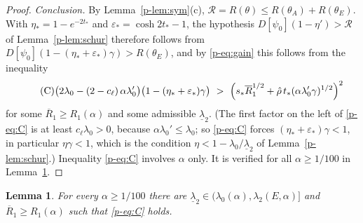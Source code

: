 \documentclass[11pt]{article}
\newtheorem{lemma}[theorem]{Lemma}
\theoremstyle{remark}
\newcommand{\cR}{\mathcal{R}}
\begin{document}
\begin{proof}
\emph{Conclusion.} By Lemma~\ref{p-lem:sym}(c), $\cR=R(\theta)\le R(\theta_A)+R(\theta_E)$. With
$\eta_*=1-e^{-2t_*}$ and $\varepsilon_*=\cosh2t_*-1$, the hypothesis
$D[\psi_0](1-\eta')>\cR$ of Lemma~\ref{p-lem:schur} therefore follows from
$D[\psi_0](1-(\eta_*+\varepsilon_*)\gamma)>R(\theta_E)$, and by \eqref{p-eq:gain} this follows
from the inequality
\begin{equation}\label{p-eq:C}\tag{C}
  \bigl(2\lambda_0-(2-c_\ell)\,\alpha\lambda_0'\bigr)\bigl(1-(\eta_*+\varepsilon_*)\gamma\bigr)
  \ >\ \Bigl(s_*\overline R_1^{1/2}+\hat\rho\,t_*(\alpha\lambda_0'\gamma)^{1/2}\Bigr)^2
\end{equation}
for some $\overline R_1\ge R_1(\alpha)$ and some admissible $\underline\lambda_2$. (The first
factor on the left of \eqref{p-eq:C} is at least $c_\ell\lambda_0>0$, because
$\alpha\lambda_0'\le\lambda_0$; so \eqref{p-eq:C} forces $(\eta_*+\varepsilon_*)\gamma<1$, in
particular $\eta\gamma<1$, which is the condition $\eta<1-\lambda_0/\underline\lambda_2$ of
Lemma~\ref{p-lem:schur}.) Inequality \eqref{p-eq:C}
involves $\alpha$ only. It is verified for all $\alpha\ge1/100$ in Lemma~\ref{p-lem:Ccheck}.
\end{proof}

\begin{lemma}\label{p-lem:Ccheck}
For every $\alpha\ge1/100$ there are $\underline\lambda_2\in(\lambda_0(\alpha),\lambda_2(E,\alpha)]$
and $\overline R_1\ge R_1(\alpha)$ such that \eqref{p-eq:C} holds.
\end{lemma}
\end{document}
